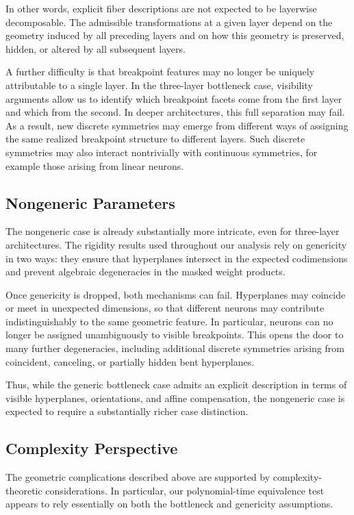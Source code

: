 \documentclass{article}
\theoremstyle{definition}
\begin{document}
In other words, explicit fiber descriptions are not expected to be layerwise decomposable. 
The admissible transformations at a given layer depend on the geometry induced by all preceding layers and on how this geometry is preserved, hidden, or altered by all subsequent layers. 

A further difficulty is that breakpoint features may no longer be uniquely attributable to a single layer. 
In the three-layer bottleneck case, visibility arguments allow us to identify which breakpoint facets come from the first layer and which from the second. 
In deeper architectures, this full separation may fail. As a result, new discrete symmetries may emerge from different ways of assigning the same realized breakpoint structure to different layers. 
Such discrete symmetries may also interact nontrivially with continuous symmetries, for example those arising from linear neurons. 


\subsection{Nongeneric Parameters}

The nongeneric case is already substantially more intricate, even for three-layer architectures. 
The rigidity results used throughout our analysis rely on genericity in two ways: 
they ensure that hyperplanes intersect in the expected codimensions and prevent algebraic degeneracies in the masked weight products. 

Once genericity is dropped, both mechanisms can fail. Hyperplanes may coincide or meet in unexpected dimensions, so that different neurons may contribute indistinguishably to the same geometric feature. 
In particular, neurons can no longer be assigned unambiguously to visible breakpoints. 
This opens the door to many further degeneracies, including additional discrete symmetries arising from coincident, canceling, or partially hidden bent hyperplanes. 

Thus, while the generic bottleneck case admits an explicit description in terms of visible hyperplanes, orientations, and affine compensation, the nongeneric case is expected to require a substantially richer case distinction. 


\subsection{Complexity Perspective}

The geometric complications described above are supported by complexity-theoretic considerations. 
In particular, our polynomial-time equivalence test appears to rely essentially on both the bottleneck and genericity assumptions.
\end{document}
